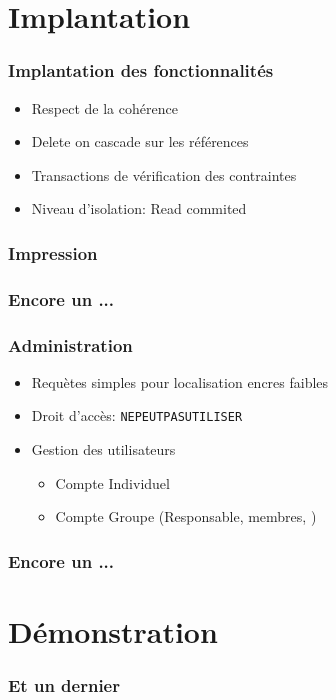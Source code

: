 \documentclass{beamer}
\begin{document}
\section[Deux]{Implantation}

\begin{frame}
  \frametitle{Implantation des fonctionnalités}
 \begin{itemize}
\item Respect de la cohérence
\item Delete on cascade sur les références
\item Transactions de vérification des contraintes
\item Niveau d'isolation: Read commited
\end{itemize}
\end{frame}

\begin{frame}
  \frametitle{Impression}
\end{frame}

\begin{frame}
  \frametitle{Encore un ...}
\end{frame}

\begin{frame}
  \frametitle{Administration}
\begin{itemize}
\item Requètes simples pour localisation encres faibles
\item Droit d'accès: \verb+NEPEUTPASUTILISER+
\item Gestion des utilisateurs
  \begin {itemize} 
\item Compte Individuel
\item Compte Groupe (Responsable, membres, )
  \end {itemize}
\end{itemize}
\end{frame}

\begin{frame}
  \frametitle{Encore un ...}
\end{frame}


\section[Trois]{Démonstration}

\begin{frame}
  \frametitle{Et un dernier}
\end{frame}
\end{document}
